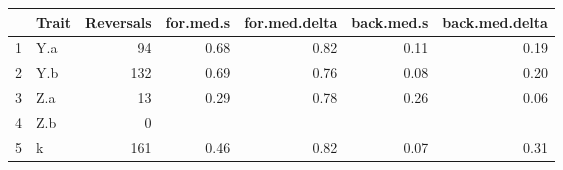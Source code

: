 \begin{table}[ht]
\begin{center}
\begin{tabular}{rlrrrrr}
  \hline
 & Trait & Reversals & for.med.s & for.med.delta & back.med.s & back.med.delta \\ 
  \hline
1 & Y.a &  94 & 0.68 & 0.82 & 0.11 & 0.19 \\ 
  2 & Y.b & 132 & 0.69 & 0.76 & 0.08 & 0.20 \\ 
  3 & Z.a &  13 & 0.29 & 0.78 & 0.26 & 0.06 \\ 
  4 & Z.b &   0 &  &  &  &  \\ 
  5 & k & 161 & 0.46 & 0.82 & 0.07 & 0.31 \\ 
   \hline
\end{tabular}
\end{center}
\end{table}
